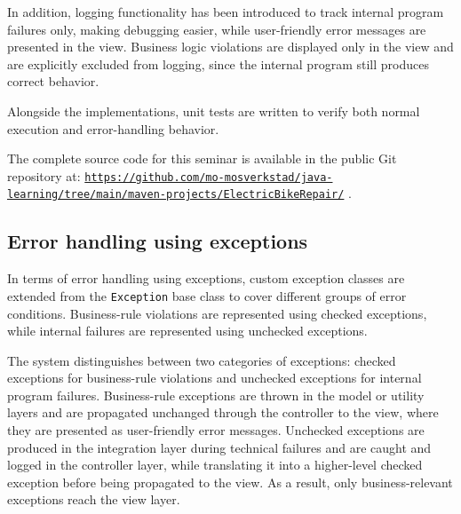 \documentclass[a4paper]{scrartcl}
\begin{document}
In addition, logging functionality has been introduced to track internal program failures only, making debugging easier, while user-friendly error messages are presented in the view. Business logic violations are displayed only in the view and are explicitly excluded from logging, since the internal program still produces correct behavior.

Alongside the implementations, unit tests are written to verify both normal execution and error-handling behavior.

The complete source code for this seminar is available in the public Git repository at: \href{https://github.com/mo-mosverkstad/java-learning/tree/main/maven-projects/ElectricBikeRepair/}{\nolinkurl{https://github.com/mo-mosverkstad/java-learning/tree/main/maven-projects/ElectricBikeRepair/}} \cite{sourcecode}.

\subsection{Error handling using exceptions}

In terms of error handling using exceptions, custom exception classes are extended from the \texttt{Exception} base class to cover different groups of error conditions. Business-rule violations are represented using checked exceptions, while internal failures are represented using unchecked exceptions.


The system distinguishes between two categories of exceptions: checked exceptions for business-rule violations and unchecked exceptions for internal program failures. Business-rule exceptions are thrown in the model or utility layers and are propagated unchanged through the controller to the view, where they are presented as user-friendly error messages. Unchecked exceptions are produced in the integration layer during technical failures and are caught and logged in the controller layer, while translating it into a higher-level checked exception before being propagated to the view. As a result, only business-relevant exceptions reach the view layer.
\end{document}
